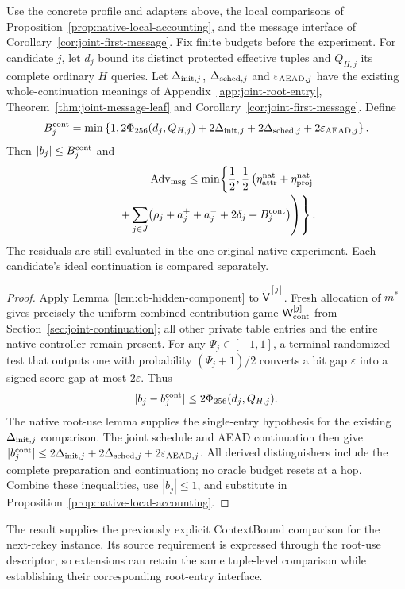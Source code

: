 \begin{theorem}
\label{thm:cb-next-rekey}
Use the concrete profile and adapters above, the local comparisons of
Proposition~\ref{prop:native-local-accounting}, and the message interface
of Corollary~\ref{cor:joint-first-message}. Fix finite budgets before the
experiment. For candidate $j$, let $d_j$ bound its distinct protected
effective tuples and $Q_{H,j}$ its complete ordinary $H$ queries. Let
$\Delta_{{\rm init},j}$, $\Delta_{{\rm sched},j}$ and
$\varepsilon_{{\rm AEAD},j}$ have the existing whole-continuation meanings
of Appendix~\ref{app:joint-root-entry},
Theorem~\ref{thm:joint-message-leaf} and
Corollary~\ref{cor:joint-first-message}. Define
\begin{equation}
 B_j^{\rm cont}=\min\left\{1,
 2\Phi_{256}(d_j,Q_{H,j})+2\Delta_{{\rm init},j}
 +2\Delta_{{\rm sched},j}+2\varepsilon_{{\rm AEAD},j}\right\}.
 \label{eq:cb-continuation-bound}
\end{equation}
Then $|b_j|\le B_j^{\rm cont}$ and
\begin{equation}
\begin{split}
 \operatorname{Adv}_{\rm msg}\le
 \min\!\left\{\frac12,\frac12\left(
 \eta_{\rm attr}^{\rm nat}+\eta_{\rm proj}^{\rm nat}\right.\right.\\[-2pt]
 \left.\left.\qquad+
 \sum_{j\in J}\bigl(\rho_j+a_j^++a_j^-+2\delta_j+B_j^{\rm cont}\bigr)
 \right)\right\}.
\end{split}
 \label{eq:cb-native-bound}
\end{equation}
The residuals are still evaluated in the one original native experiment.
Each candidate's ideal continuation is compared separately.
\end{theorem}
\begin{proof}
Apply Lemma~\ref{lem:cb-hidden-component} to
$\widetilde{\mathsf V}^{[j]}$. Fresh allocation of $m^*$ gives precisely
the uniform-combined-contribution game
$\mathsf W_{\rm cont}^{[j]}$ from
Section~\ref{sec:joint-continuation}; all other private table entries and
the entire native controller remain present. For any
$\Psi_j\in[-1,1]$, a terminal randomized test that outputs one with
probability $(\Psi_j+1)/2$ converts a bit gap $\varepsilon$ into a signed
score gap at most $2\varepsilon$. Thus
\[
 |b_j-b_j^{\rm cont}|\le2\Phi_{256}(d_j,Q_{H,j}).
\]
The native root-use lemma supplies the single-entry hypothesis for the
existing $\Delta_{{\rm init},j}$ comparison. The joint schedule and AEAD
continuation then give
$|b_j^{\rm cont}|\le2\Delta_{{\rm init},j}
 +2\Delta_{{\rm sched},j}+2\varepsilon_{{\rm AEAD},j}$.
All derived distinguishers include the complete preparation and continuation;
no oracle budget resets at a hop. Combine these inequalities, use
$|b_j|\le1$, and substitute in
Proposition~\ref{prop:native-local-accounting}.
\end{proof}

The result supplies the previously explicit ContextBound comparison for the
next-rekey instance. Its source requirement is expressed through the root-use
descriptor, so extensions can retain the same tuple-level comparison while
establishing their corresponding root-entry interface.

